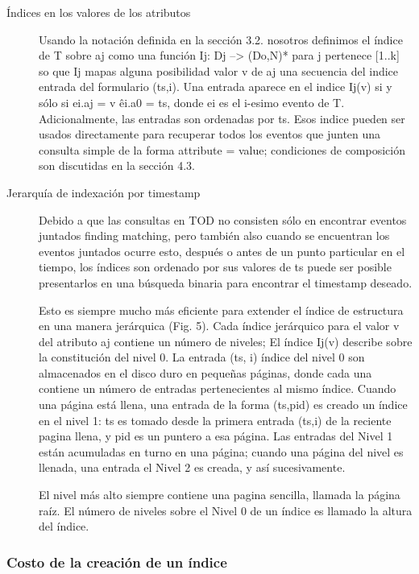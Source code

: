 \documentclass[12pt,a4paper]{report}
\begin{document}
\begin{description}
	\item[Índices en los valores de los atributos] Usando la notación definida en la sección 3.2.  nosotros definimos el índice de T sobre aj como una función Ij: Dj --> (Do,N)* para j pertenece [1..k] so que Ij mapas alguna posibilidad valor v de aj una secuencia del indice entrada del formulario (ts,i).  Una entrada aparece en el indice Ij(v) si y sólo si ei.aj = v \^ ei.a0 = ts, donde ei es el i-esimo evento de T.  Adicionalmente, las entradas son ordenadas por ts.  Esos indice pueden ser usados directamente para recuperar todos los eventos que junten una consulta simple de la forma attribute = value; condiciones de composición son discutidas en la sección 4.3.

	\item[Jerarquía de indexación por timestamp] Debido a que las consultas en TOD no consisten sólo en encontrar eventos juntados {finding matching}, pero también {also} cuando se encuentran los eventos juntados ocurre esto, después o antes de un punto particular en el tiempo, los índices son ordenado por sus valores de ts puede ser posible presentarlos en una búsqueda binaria para encontrar el timestamp deseado.

Esto es siempre mucho más eficiente para extender el índice de estructura en una manera jerárquica (Fig. 5).  Cada índice jerárquico para el valor v del atributo aj contiene un número de niveles;  El índice Ij(v) describe sobre la constitución del nivel 0.  La entrada (ts, i) índice del nivel 0 son almacenados en el disco duro en pequeñas páginas, donde cada una contiene un número de entradas pertenecientes al mismo índice.  Cuando una página está llena, una entrada de la forma (ts,pid) es creado un índice en el nivel 1: ts es tomado desde la primera entrada (ts,i) de la reciente pagina llena, y pid es un puntero a esa página.  Las entradas del Nivel 1 están acumuladas en turno en una página; cuando una página del nivel es llenada, una entrada el Nivel 2 es creada, y así sucesivamente.  

El nivel más alto siempre contiene una pagina sencilla, llamada la página raíz.  El número de niveles sobre el Nivel 0 de un índice es llamado la altura del índice.  
\end{description}


			\subsubsection{Costo de la creación de un índice}
\end{document}
